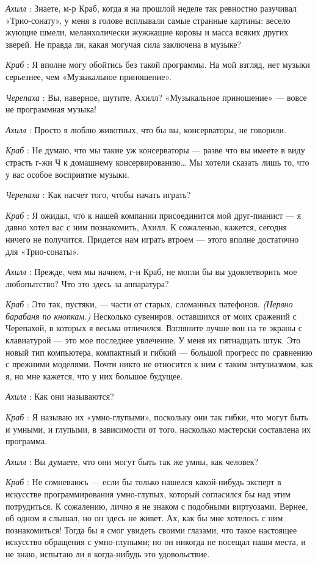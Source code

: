\emph{Ахилл} : Знаете, м-р Краб, когда я на прошлой неделе так ревностно разучивал «Трио-сонату», у меня в голове всплывали самые странные картины: весело жующие шмели, меланхолически жужжащие коровы и масса всяких других зверей. Не правда ли, какая могучая сила заключена в музыке?

\emph{Краб} : Я вполне могу обойтись без такой программы. На мой взгляд, нет музыки серьезнее, чем «Музыкальное приношение».

\emph{Черепаха} : Вы, наверное, шутите, Ахилл? «Музыкальное приношение» --- вовсе не программная музыка!

\emph{Ахилл} : Просто я люблю животных, что бы вы, консерваторы, не говорили.

\emph{Краб} : Не думаю, что мы такие уж консерваторы --- разве что вы имеете в виду страсть г-жи Ч к домашнему консервированию\ldots{} Мы хотели сказать лишь то, что у вас особое восприятие музыки.

\emph{Черепаха} : Как насчет того, чтобы начать играть?

\emph{Краб} : Я ожидал, что к нашей компании присоединится мой друг-пианист --- я давно хотел вас с ним познакомить, Ахилл. К сожаленью, кажется, сегодня ничего не получится. Придется нам играть втроем --- этого вполне достаточно для «Трио-сонаты».

\emph{Ахилл} : Прежде, чем мы начнем, г-н Краб, не могли бы вы удовлетворить мое любопытство? Что это здесь за аппаратура?

\emph{Краб} : Это так, пустяки, --- части от старых, сломанных патефонов. \emph{(Нервно барабаня по кнопкам.)} Несколько сувениров, оставшихся от моих сражений с Черепахой, в которых я весьма отличился. Взгляните лучше вон на те экраны с клавиатурой --- это мое последнее увлечение. У меня их пятнадцать штук. Это новый тип компьютера, компактный и гибкий --- большой прогресс по сравнению с прежними моделями. Почти никто не относится к ним с таким энтузиазмом, как я, но мне кажется, что у них большое будущее.

\emph{Ахилл} : Как они называются?

\emph{Краб} : Я называю их «умно-глупыми», поскольку они так гибки, что могут быть и умными, и глупыми, в зависимости от того, насколько мастерски составлена их программа.

\emph{Ахилл} : Вы думаете, что они могут быть так же умны, как человек?

\emph{Краб} : Не сомневаюсь --- если бы только нашелся какой-нибудь эксперт в искусстве программирования умно-глупых, который согласился бы над этим потрудиться. К сожалению, лично я не знаком с подобными виртуозами. Вернее, об одном я слышал, но он здесь не живет. Ах, как бы мне хотелось с ним познакомиться! Тогда бы я смог увидеть своими глазами, что такое настоящее искусство обращения с умно-глупыми; но он никогда не посещал наши места, и не знаю, испытаю ли я когда-нибудь это удовольствие.

